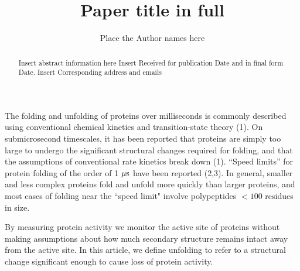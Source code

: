 \documentclass[a4paper,10pt,twoside]{article}
\begin{document}
\setcounter{page}{1} %

\title{Paper title in full}


\author{Place the Author names here}

\address{Place the Author addresses here}





\begin{abstract}%
{Insert abstract information here}%
{Insert Received for publication Date and in final form Date.}%
{Insert Corresponding address and emails}%
\end{abstract}

\maketitle %



The folding and unfolding of proteins over milliseconds is commonly described using conventional chemical kinetics and transition-state theory (1). On submicrosecond timescales, it has been reported that proteins are simply too large to undergo the significant structural changes required for folding, and that the assumptions of conventional rate kinetics break down (1). ``Speed limits'' for protein folding of the order of 1 $\mu{\rm s}$ have been reported (2,3). In general, smaller and less complex proteins fold and unfold more quickly than larger proteins, and most cases of folding near the ``speed limit" involve polypeptides ${<}100$ residues in size.

By measuring protein activity we monitor the active site of proteins without making assumptions about how much secondary structure remains intact away from the active site. In this article, we define unfolding to refer to a structural change significant enough to cause loss of protein activity.
\end{document}
